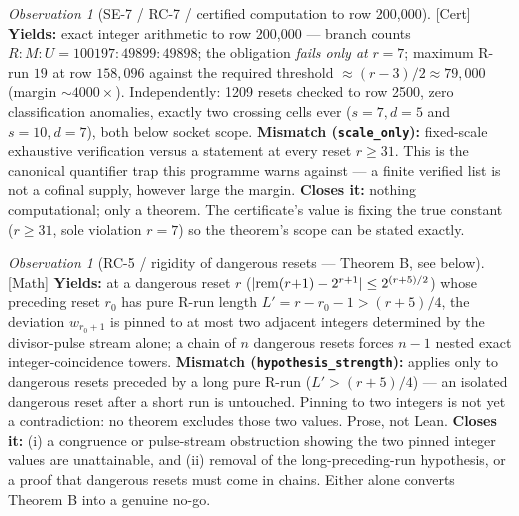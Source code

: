 \documentclass[11pt]{article}
\theoremstyle{plain}
\theoremstyle{definition}
\theoremstyle{remark}
\newtheorem{obs}[thm]{Observation}
\let\origmathrm\mathrm
\renewcommand{\mathrm}[1]{\ifmmode\origmathrm{#1}\else\textrm{#1}\fi}%
\newcommand{\ev}[1]{{\small\textsf{[#1]}}\xspace}
\begin{document}
\begin{obs}[SE-7 / RC-7 / certified computation to row 200{,}000] \ev{Cert}
\textbf{Yields:} exact integer arithmetic to row 200{,}000 — branch counts $R\!:\!M\!:\!U =
100197\!:\!49899\!:\!49898$; the obligation \emph{fails only at} $r=7$; maximum R-run $19$ at row
$158{,}096$ against the required threshold $\approx (r-3)/2 \approx 79{,}000$ (margin
$\sim\!4000\times$). Independently: 1209 resets checked to row 2500, zero classification
anomalies, exactly two crossing cells ever ($s{=}7,d{=}5$ and $s{=}10,d{=}7$), both below socket
scope.
\textbf{Mismatch (\texttt{scale\_only}):} fixed-scale exhaustive verification versus a statement
at every reset $r \ge 31$. This is the canonical quantifier trap this programme warns against — a
finite verified list is not a cofinal supply, however large the margin.
\textbf{Closes it:} nothing computational; only a theorem. The certificate's value is fixing the
true constant ($r \ge 31$, sole violation $r=7$) so the theorem's scope can be stated exactly.
\end{obs}

\begin{obs}[RC-5 / rigidity of dangerous resets — Theorem B, see below] \ev{Math}
\textbf{Yields:} at a dangerous reset $r$ ($|\mathrm{rem}(r{+}1)-2^{r+1}| \le 2^{(r+5)/2}$) whose
preceding reset $r_0$ has pure R-run length $L' = r-r_0-1 > (r+5)/4$, the deviation
$w_{r_0+1}$ is pinned to at most two adjacent integers determined by the divisor-pulse stream
alone; a chain of $n$ dangerous resets forces $n{-}1$ nested exact integer-coincidence towers.
\textbf{Mismatch (\texttt{hypothesis\_strength}):} applies only to dangerous resets preceded by a
long pure R-run ($L' > (r+5)/4$) — an isolated dangerous reset after a short run is untouched.
Pinning to two integers is not yet a contradiction: no theorem excludes those two values. Prose,
not Lean.
\textbf{Closes it:} (i) a congruence or pulse-stream obstruction showing the two pinned integer
values are unattainable, and (ii) removal of the long-preceding-run hypothesis, or a proof that
dangerous resets must come in chains. Either alone converts Theorem B into a genuine no-go.
\end{obs}
\end{document}
